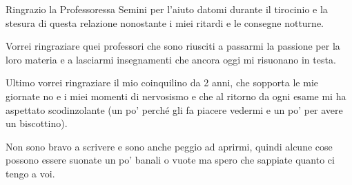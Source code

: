 Ringrazio la Professoressa Semini per l'aiuto datomi durante il tirocinio e la stesura di questa relazione nonostante i miei ritardi e le consegne notturne.

Vorrei ringraziare quei professori che sono riusciti a passarmi la passione per la loro materia e a lasciarmi insegnamenti che ancora oggi mi risuonano in testa.

Ultimo vorrei ringraziare il mio coinquilino da 2 anni, che sopporta le mie giornate no e i miei momenti di nervosismo e che al ritorno da ogni esame mi ha aspettato scodinzolante (un po' perché gli fa piacere vedermi e un po' per avere un biscottino).

Non sono bravo a scrivere e sono anche peggio ad aprirmi, quindi alcune cose possono essere suonate un po' banali o vuote ma spero che sappiate quanto ci tengo a voi.